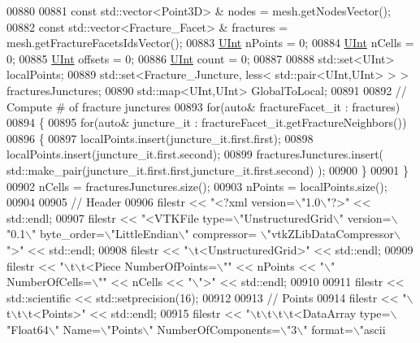 \begin{DoxyCode}
00880 
00881     \textcolor{keyword}{const} std::vector<Point3D> & nodes = mesh.getNodesVector();
00882     \textcolor{keyword}{const} std::vector<Fracture\_Facet> & fractures = mesh.getFractureFacetsIdsVector();
00883     \hyperlink{namespaceFVCode3D_a4bf7e328c75d0fd504050d040ebe9eda}{UInt} nPoints = 0;
00884     \hyperlink{namespaceFVCode3D_a4bf7e328c75d0fd504050d040ebe9eda}{UInt} nCells = 0;
00885     \hyperlink{namespaceFVCode3D_a4bf7e328c75d0fd504050d040ebe9eda}{UInt} offsets = 0;
00886     \hyperlink{namespaceFVCode3D_a4bf7e328c75d0fd504050d040ebe9eda}{UInt} count = 0;
00887 
00888     std::set<UInt> localPoints;
00889     std::set<Fracture\_Juncture, less< std::pair<UInt,UInt> > > fracturesJunctures;
00890     std::map<UInt,UInt> GlobalToLocal;
00891 
00892     \textcolor{comment}{// Compute # of fracture junctures}
00893     \textcolor{keywordflow}{for}(\textcolor{keyword}{auto}& fractureFacet\_it : fractures)
00894     \{
00895         \textcolor{keywordflow}{for}(\textcolor{keyword}{auto}& juncture\_it : fractureFacet\_it.getFractureNeighbors())
00896         \{
00897             localPoints.insert(juncture\_it.first.first);
00898             localPoints.insert(juncture\_it.first.second);
00899             fracturesJunctures.insert( std::make\_pair(juncture\_it.first.first,juncture\_it.first.second) );
00900         \}
00901     \}
00902     nCells = fracturesJunctures.size();
00903     nPoints = localPoints.size();
00904 
00905     \textcolor{comment}{// Header}
00906     filestr << \textcolor{stringliteral}{"<?xml version=\(\backslash\)"1.0\(\backslash\)"?>"} << std::endl;
00907     filestr << \textcolor{stringliteral}{"<VTKFile type=\(\backslash\)"UnstructuredGrid\(\backslash\)" version=\(\backslash\)"0.1\(\backslash\)" byte\_order=\(\backslash\)"LittleEndian\(\backslash\)" compressor=
      \(\backslash\)"vtkZLibDataCompressor\(\backslash\)">"} << std::endl;
00908     filestr << \textcolor{stringliteral}{"\(\backslash\)t<UnstructuredGrid>"} << std::endl;
00909     filestr << \textcolor{stringliteral}{"\(\backslash\)t\(\backslash\)t<Piece NumberOfPoints=\(\backslash\)""} << nPoints << \textcolor{stringliteral}{"\(\backslash\)" NumberOfCells=\(\backslash\)""} << nCells << \textcolor{stringliteral}{"\(\backslash\)">"} << 
      std::endl;
00910 
00911     filestr << std::scientific << std::setprecision(16);
00912 
00913     \textcolor{comment}{// Points}
00914     filestr << \textcolor{stringliteral}{"\(\backslash\)t\(\backslash\)t\(\backslash\)t<Points>"} << std::endl;
00915     filestr << \textcolor{stringliteral}{"\(\backslash\)t\(\backslash\)t\(\backslash\)t\(\backslash\)t<DataArray type=\(\backslash\)"Float64\(\backslash\)" Name=\(\backslash\)"Points\(\backslash\)" NumberOfComponents=\(\backslash\)"3\(\backslash\)" format=\(\backslash\)"ascii
}
\end{DoxyCode}
